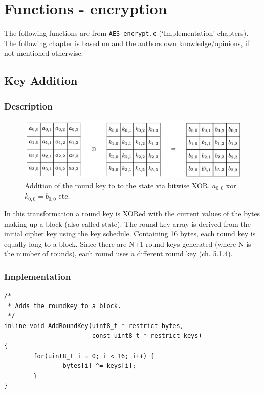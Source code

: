 \hypertarget{functions---Encryption}{%
\chapter{Functions - encryption}\label{functions---encryption}}

The following functions are from \lstinline|AES_encrypt.c|
(`Implementation'-chapters). The following chapter is based on \cite{aes2001} and the authors own
knowledge/opinions, if not mentioned otherwise.

\hypertarget{key-addition}{%
\section{Key Addition}\label{key-addition}}

\hypertarget{description-2}{%
\subsection{Description}\label{description-2}}

\begin{figure}
\centering
\includegraphics[scale = 0.3]{data/figures/addroundkey.png}
\caption{Addition of the round key to to the state via bitwise \ac{XOR}. $a_{0,0}$ xor $k_{0,0} = b_{0,0}$ etc. \cite[p. 41]{rijndael}}
\end{figure}

In this transformation a round key is
\ac{XOR}ed with the current values of the bytes making up a block (also called state). The round key array is
derived from the initial cipher key using the key schedule. Containing
16 bytes, each round key is equally long to a block. Since there are N+1
round keys generated (where N is the number of rounds), each round uses
a different round key (ch. 5.1.4).

\hypertarget{implementation-2}{%
\subsection{Implementation}\label{implementation-2}}

\begin{lstlisting}
/*
 * Adds the roundkey to a block.
 */
inline void AddRoundKey(uint8_t * restrict bytes,
                        const uint8_t * restrict keys)
{
        for(uint8_t i = 0; i < 16; i++) {
                bytes[i] ^= keys[i];
        }
}
\end{lstlisting}

